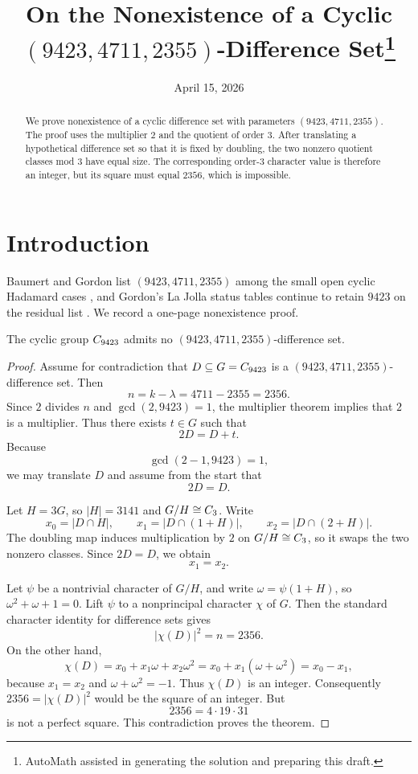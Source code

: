 \documentclass[11pt]{amsart}
\begin{document}
\title[No Cyclic $(9423,4711,2355)$ Difference Set]{On the Nonexistence of a Cyclic $(9423,4711,2355)$-Difference Set\thanks{AutoMath assisted in generating the solution and preparing this draft.}}
\date{April 15, 2026}

\begin{abstract}
We prove nonexistence of a cyclic difference set with parameters $(9423,4711,2355)$.
The proof uses the multiplier $2$ and the quotient of order $3$.
After translating a hypothetical difference set so that it is fixed by doubling, the two nonzero quotient classes mod $3$ have equal size.
The corresponding order-$3$ character value is therefore an integer, but its square must equal $2356$, which is impossible.
\end{abstract}

\maketitle

\section{Introduction}
Baumert and Gordon list $(9423,4711,2355)$ among the small open cyclic Hadamard cases \cite{BG2004}, and Gordon's La Jolla status tables continue to retain $9423$ on the residual list \cite{Gordon2019}.
We record a one-page nonexistence proof.

\begin{theorem}
The cyclic group $C_{9423}$ admits no $(9423,4711,2355)$-difference set.
\end{theorem}

\begin{proof}
Assume for contradiction that $D\subseteq G=C_{9423}$ is a $(9423,4711,2355)$-difference set.
Then
\[
n=k-\lambda=4711-2355=2356.
\]
Since $2$ divides $n$ and $\gcd(2,9423)=1$, the multiplier theorem implies that $2$ is a multiplier.
Thus there exists $t\in G$ such that
\[
2D=D+t.
\]
Because
\[
\gcd(2-1,9423)=1,
\]
we may translate $D$ and assume from the start that
\[
2D=D.
\]

Let $H=3G$, so $|H|=3141$ and $G/H\cong C_{3}$.
Write
\[
x_0=|D\cap H|,\qquad
x_1=|D\cap (1+H)|,\qquad
x_2=|D\cap (2+H)|.
\]
The doubling map induces multiplication by $2$ on $G/H\cong C_{3}$, so it swaps the two nonzero classes.
Since $2D=D$, we obtain
\[
x_1=x_2.
\]

Let $\psi$ be a nontrivial character of $G/H$, and write $\omega=\psi(1+H)$, so $\omega^2+\omega+1=0$.
Lift $\psi$ to a nonprincipal character $\chi$ of $G$.
Then the standard character identity for difference sets gives
\[
|\chi(D)|^2=n=2356.
\]
On the other hand,
\[
\chi(D)=x_0+x_1\omega+x_2\omega^2 = x_0+x_1(\omega+\omega^2)=x_0-x_1,
\]
because $x_1=x_2$ and $\omega+\omega^2=-1$.
Thus $\chi(D)$ is an integer.
Consequently $2356=|\chi(D)|^2$ would be the square of an integer.
But
\[
2356 = 4\cdot 19\cdot 31
\]
is not a perfect square.
This contradiction proves the theorem.
\end{proof}
\end{document}
